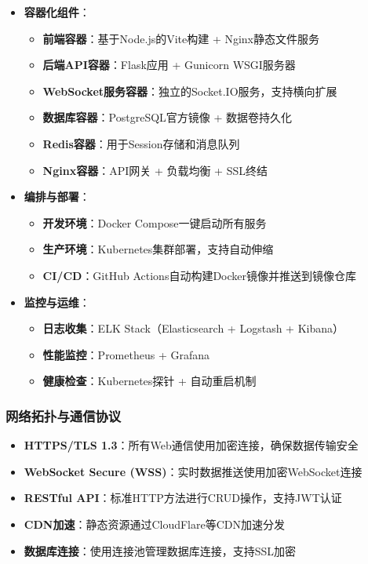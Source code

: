 \documentclass[a4paper,12pt]{article}
\begin{document}
\begin{itemize}
  \item \textbf{容器化组件}：
    \begin{itemize}
      \item \textbf{前端容器}：基于Node.js的Vite构建 + Nginx静态文件服务
      \item \textbf{后端API容器}：Flask应用 + Gunicorn WSGI服务器
      \item \textbf{WebSocket服务容器}：独立的Socket.IO服务，支持横向扩展
      \item \textbf{数据库容器}：PostgreSQL官方镜像 + 数据卷持久化
      \item \textbf{Redis容器}：用于Session存储和消息队列
      \item \textbf{Nginx容器}：API网关 + 负载均衡 + SSL终结
    \end{itemize}
  \item \textbf{编排与部署}：
    \begin{itemize}
      \item \textbf{开发环境}：Docker Compose一键启动所有服务
      \item \textbf{生产环境}：Kubernetes集群部署，支持自动伸缩
      \item \textbf{CI/CD}：GitHub Actions自动构建Docker镜像并推送到镜像仓库
    \end{itemize}
  \item \textbf{监控与运维}：
    \begin{itemize}
      \item \textbf{日志收集}：ELK Stack（Elasticsearch + Logstash + Kibana）
      \item \textbf{性能监控}：Prometheus + Grafana
      \item \textbf{健康检查}：Kubernetes探针 + 自动重启机制
    \end{itemize}
\end{itemize}

\subsubsection{网络拓扑与通信协议}
\begin{itemize}
  \item \textbf{HTTPS/TLS 1.3}：所有Web通信使用加密连接，确保数据传输安全
  \item \textbf{WebSocket Secure (WSS)}：实时数据推送使用加密WebSocket连接
  \item \textbf{RESTful API}：标准HTTP方法进行CRUD操作，支持JWT认证
  \item \textbf{CDN加速}：静态资源通过CloudFlare等CDN加速分发
  \item \textbf{数据库连接}：使用连接池管理数据库连接，支持SSL加密
\end{itemize}
\end{document}
